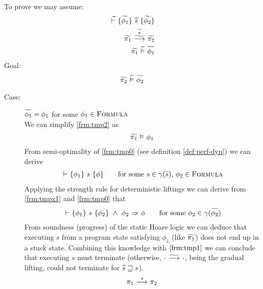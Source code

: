 \begin{proofatend}~\\
    To prove  we may assume:
    \begin{align}
    \label{frm:tmp0}
    \dgthoare{}{\grad{\phi_1}}{\grad{s}}{\grad{\phi_2}}\\
    \label{frm:tmp1}
    \gsstepConsume{\grad{s}}{\grad{\pi_1}}{\grad{\pi_2}}\\
    \label{frm:tmp2}
    \evalgphiGen{\grad{\pi_1}}{\grad{\phi_1}}
    \end{align}
    Goal: 
    \begin{align}
    \label{frm:tmp3}
    \evalgphiGen{\grad{\pi_2}}{\grad{\phi_2}}
    \end{align}
    
    \begin{description}
        \item[Case:] $\widetilde{\phi_1} = \phi_1$ for some $\phi_1 \in \textup{\textsc{Formula}}$~\\
        We can simplify \ref{frm:tmp2} as
        \begin{align}
        \label{frm:tmpx0}
        \evalphiGen{\grad{\pi_1}}{\phi_1}
        \end{align}
        From semi-optimality of \ref{frm:tmp0} (see definition \ref{def:perf-dyn}) we can derive
        \begin{align}
        \label{frm:tmpx1}
        \thoare{}{\phi_1}{s}{\phi}
        \quad\quad\text{for some } s \in \gamma(\grad{s}),\, \phi_2 \in \setFormula
        \end{align}
        Applying the strength rule for deterministic liftings we can derive from \ref{frm:tmpx1} and \ref{frm:tmp0} that
        \begin{align}
        \label{frm:tmpx2}
        \thoare{}{\phi_1}{s}{\phi_2} ~\wedge~ \phiImplies{\phi_2}{\phi}
        \quad\quad\text{for some } \phi_2 \in \gamma(\grad{\phi_2})
        \end{align}
        From soundness (progress) of the static Hoare logic we can deduce that executing $s$ from a program state satisfying $\phi_1$ (like $\widetilde{\pi_1}$) does not end up in a stuck state.
        Combining this knowledge with $\ref{frm:tmp1}$ we can conclude that executing $s$ must terminate (otherwise, ${\cdot} \,\,{\widetilde{\longrightarrow}^{}}\,\, {\cdot}$, being the gradual lifting, could not terminate for $\widetilde{s} \sqsupseteq s$).
        \begin{align}
        \label{frm:tmpx3}
        \sstepConsume{s}{\pi_1}{\pi_2}

\end{align}
\end{description}
\end{proofatend}
